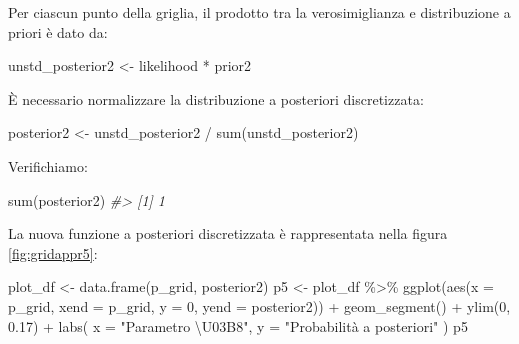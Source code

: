 \documentclass[
]{memoir}
\newenvironment{Shaded}{\begin{snugshade}}{\end{snugshade}}
\newcommand{\AttributeTok}[1]{\textcolor[rgb]{0.77,0.63,0.00}{#1}}
\newcommand{\CommentTok}[1]{\textcolor[rgb]{0.56,0.35,0.01}{\textit{#1}}}
\newcommand{\DecValTok}[1]{\textcolor[rgb]{0.00,0.00,0.81}{#1}}
\newcommand{\FloatTok}[1]{\textcolor[rgb]{0.00,0.00,0.81}{#1}}
\newcommand{\FunctionTok}[1]{\textcolor[rgb]{0.00,0.00,0.00}{#1}}
\newcommand{\NormalTok}[1]{#1}
\newcommand{\OtherTok}[1]{\textcolor[rgb]{0.56,0.35,0.01}{#1}}
\newcommand{\SpecialCharTok}[1]{\textcolor[rgb]{0.00,0.00,0.00}{#1}}
\newcommand{\StringTok}[1]{\textcolor[rgb]{0.31,0.60,0.02}{#1}}
\begin{document}
\noindent
Per ciascun punto della griglia, il prodotto tra la verosimiglianza e distribuzione a priori è dato da:

\begin{Shaded}
\begin{Highlighting}[]
\NormalTok{unstd\_posterior2 }\OtherTok{\textless{}{-}}\NormalTok{ likelihood }\SpecialCharTok{*}\NormalTok{ prior2}
\end{Highlighting}
\end{Shaded}

\noindent
È necessario normalizzare la distribuzione a posteriori discretizzata:

\begin{Shaded}
\begin{Highlighting}[]
\NormalTok{posterior2 }\OtherTok{\textless{}{-}}\NormalTok{ unstd\_posterior2 }\SpecialCharTok{/} \FunctionTok{sum}\NormalTok{(unstd\_posterior2)}
\end{Highlighting}
\end{Shaded}

\noindent
Verifichiamo:

\begin{Shaded}
\begin{Highlighting}[]
\FunctionTok{sum}\NormalTok{(posterior2)}
\CommentTok{\#\textgreater{} [1] 1}
\end{Highlighting}
\end{Shaded}

\noindent
La nuova funzione a posteriori discretizzata è rappresentata nella figura \ref{fig:gridappr5}:

\begin{Shaded}
\begin{Highlighting}[]
\NormalTok{plot\_df }\OtherTok{\textless{}{-}} \FunctionTok{data.frame}\NormalTok{(p\_grid, posterior2)}
\NormalTok{p5 }\OtherTok{\textless{}{-}}\NormalTok{ plot\_df }\SpecialCharTok{\%\textgreater{}\%}
  \FunctionTok{ggplot}\NormalTok{(}\FunctionTok{aes}\NormalTok{(}\AttributeTok{x =}\NormalTok{ p\_grid, }\AttributeTok{xend =}\NormalTok{ p\_grid, }\AttributeTok{y =} \DecValTok{0}\NormalTok{, }\AttributeTok{yend =}\NormalTok{ posterior2)) }\SpecialCharTok{+}
  \FunctionTok{geom\_segment}\NormalTok{() }\SpecialCharTok{+}
  \FunctionTok{ylim}\NormalTok{(}\DecValTok{0}\NormalTok{, }\FloatTok{0.17}\NormalTok{) }\SpecialCharTok{+}
  \FunctionTok{labs}\NormalTok{(}
    \AttributeTok{x =} \StringTok{"Parametro \textbackslash{}U03B8"}\NormalTok{,}
    \AttributeTok{y =} \StringTok{"Probabilità a posteriori"}
\NormalTok{  )}
\NormalTok{p5}
\end{Highlighting}
\end{Shaded}
\end{document}
